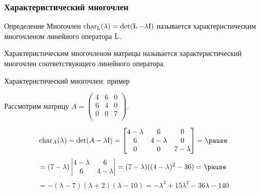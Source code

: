  \begin{frame}
     \frametitle{Характеристический многочлен}

     \begin{block}{Определение}
         Многочлен $\operatorname{char}_{\operatorname{L}}(\lambda) = \det (\operatorname{L} - \lambda \mathrm{I})$ называется
         \alert{характеристическим многочленом} линейного оператора $\operatorname{L}$.
     \end{block}

     \pause

     Характеристическим многочленом матрицы называется характеристический многочлен соответствующего линейного оператора.
    
 \end{frame}


 \begin{frame}{Характеристический многочлен: пример}

    Рассмотрим матрицу $A = \begin{pmatrix}
        4 & 6 & 0 \\
        6 & 4 & 0 \\
        0 & 0 & 7 \\
    \end{pmatrix}.$

    \pause
    \[
    \charp_A(\lambda) = \det (A - \lambda \Id) = \begin{bmatrix}
4-\lambda & 6 & 0 \\
6 & 4-\lambda & 0 \\
0 & 0 & 7-\lambda \\        
    \end{bmatrix} = \pause
    \]
    \[ = (7-\lambda) \begin{vmatrix}
4-\lambda & 6  \\
6 & 4-\lambda \\
\end{vmatrix} = (7-\lambda)((4-\lambda)^2 - 36) = \pause
\]
\[
 = -(\lambda - 7)(\lambda + 2)(\lambda - 10) = 
 -\lambda^3  + 15\lambda^2   -36 \lambda  - 140  
    \]

 \end{frame}



